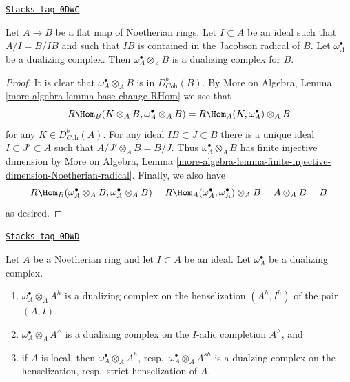 \begin{lemma}
\label{dualizing-lemma-flat-iso-mod-I}
\href{https://stacks.math.columbia.edu/tag/0DWC}{\texttt{Stacks tag 0DWC}}

Let $A \to B$ be a flat map of Noetherian rings. Let
$I \subset A$ be an ideal such that $A/I = B/IB$ and
such that $IB$ is contained in the Jacobson radical of $B$.
Let $\omega_A^\bullet$ be a dualizing complex.
Then $\omega_A^\bullet \otimes_A B$ is a dualizing
complex for $B$.
\end{lemma}

\begin{proof}
It is clear that $\omega_A^\bullet \otimes_A B$ is in $D^b_{\textit{Coh}}(B)$.
By More on Algebra, Lemma \ref{more-algebra-lemma-base-change-RHom}
we see that
$$
R\Hom_B(K \otimes_A B, \omega_A^\bullet \otimes_A B) =
R\Hom_A(K, \omega_A^\bullet) \otimes_A B
$$
for any $K \in D^b_{\textit{Coh}}(A)$. For any ideal
$IB \subset J \subset B$ there is a unique ideal $I \subset J' \subset A$
such that $A/J' \otimes_A B = B/J$. Thus $\omega_A^\bullet \otimes_A B$
has finite injective dimension by
More on Algebra, Lemma
\ref{more-algebra-lemma-finite-injective-dimension-Noetherian-radical}.
Finally, we also have
$$
R\Hom_B(\omega_A^\bullet \otimes_A B, \omega_A^\bullet \otimes_A B) =
R\Hom_A(\omega_A^\bullet, \omega_A^\bullet) \otimes_A B = A \otimes_A B = B
$$
as desired.
\end{proof}

\begin{lemma}
\label{dualizing-lemma-completion-henselization-dualizing}
\href{https://stacks.math.columbia.edu/tag/0DWD}{\texttt{Stacks tag 0DWD}}

Let $A$ be a Noetherian ring and let $I \subset A$ be an ideal.
Let $\omega_A^\bullet$ be a dualizing complex.
\begin{enumerate}
\item $\omega_A^\bullet \otimes_A A^h$ is a dualizing complex on the
henselization $(A^h, I^h)$ of the pair $(A, I)$,
\item $\omega_A^\bullet \otimes_A A^\wedge$ is a dualizing complex on
the $I$-adic completion $A^\wedge$, and
\item if $A$ is local, then $\omega_A^\bullet \otimes_A A^h$,
resp.\ $\omega_A^\bullet \otimes_A A^{sh}$ is a dualzing complex
on the henselization, resp.\ strict henselization of $A$.
\end{enumerate}
\end{lemma}


